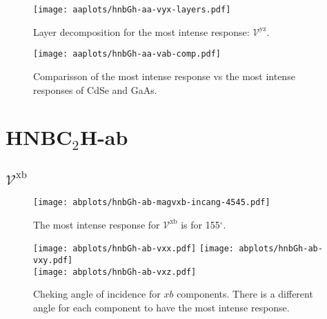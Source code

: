 \documentclass{article}
\let\Oldsection\section
\renewcommand{\section}{\FloatBarrier\Oldsection}
\let\Oldsubsection\subsection
\renewcommand{\subsection}{\FloatBarrier\Oldsubsection}
\begin{document}
\begin{figure}[ht]
    \centering
    \texttt{[image: aaplots/hnbGh-aa-vyx-layers.pdf]}
    \caption{Layer decomposition for the most intense response:
    $\mathcal{V}^{\mathrm{yz}}$.}
    \label{fig:aa-lay}
\end{figure}

\begin{figure}[ht]
    \centering
    \texttt{[image: aaplots/hnbGh-aa-vab-comp.pdf]}
    \caption{Comparisson of the most intense response vs the most intense
    responses of CdSe and GaAs.}
    \label{fig:aa-comp}
\end{figure}






\section{HNBC$_{2}$H-ab} %


\subsection{$\mathcal{V}^{\mathrm{xb}} $}
\begin{figure}[h!]
    \centering
    \texttt{[image: abplots/hnbGh-ab-magvxb-incang-4545.pdf]}
    \caption{The most intense response for $\mathcal{V}^{\mathrm{xb}} $ is for 
    155$^{\circ}$.}
    \label{fig:ab-magvxbincang}
\end{figure}
\begin{figure}[h!]
    \centering
    \texttt{[image: abplots/hnbGh-ab-vxx.pdf]}
    \texttt{[image: abplots/hnbGh-ab-vxy.pdf]}\\
    \texttt{[image: abplots/hnbGh-ab-vxz.pdf]}
    \caption{Cheking angle of incidence for $xb$ components. There is a
    different angle for each component to have the most intense response.}
    \label{fig:ab-xbangcomp}
\end{figure}
\end{document}
